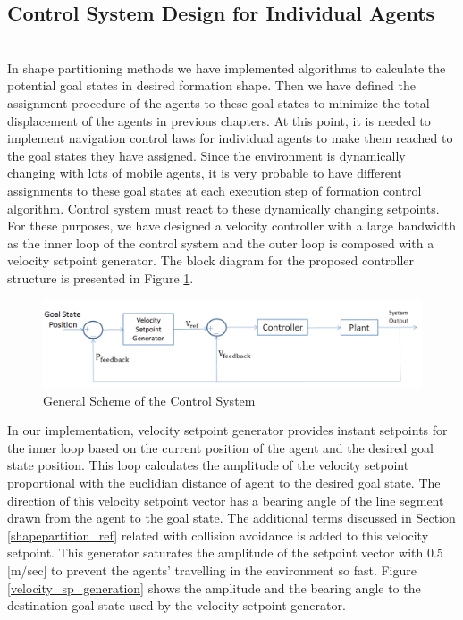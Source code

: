 \subsection{Control System Design for Individual Agents}\hspace{0pt}\label{lqr_design}  \\ 
In shape partitioning methods we have implemented algorithms to calculate the potential goal states in desired formation shape. Then we have defined the assignment procedure of the agents to these goal states to minimize the total displacement of the agents in previous chapters. At this point, it is needed to implement navigation control laws for individual agents to make them reached to the goal states they have assigned. Since the environment is dynamically changing with lots of  mobile agents, it is very probable to have different assignments to these goal states at each execution step of formation control algorithm. Control system must react to these dynamically changing setpoints. For these purposes, we have designed a velocity controller with a large bandwidth as the inner loop of the control system and the outer loop is composed with a velocity setpoint generator. The block diagram for the proposed controller structure is presented in Figure \ref{Controller_ref}.

\begin{figure}[H]
\caption{General Scheme of the Control System} \label{Controller_ref}
\centering
\includegraphics[scale = 0.45]{controller}
\end{figure}

In our implementation, velocity setpoint generator provides instant setpoints for the inner loop based on the current position of the agent and the desired goal state position.  This loop calculates the amplitude of the velocity setpoint proportional with the euclidian distance of agent to the desired goal state. The direction of this velocity setpoint vector has a bearing angle of the line segment drawn from the agent to the goal state. The additional terms discussed in Section \ref{shapepartition_ref} related with collision avoidance is added to this velocity setpoint. This generator saturates the amplitude of the setpoint vector with 0.5 [m/sec] to prevent the agents' travelling in the environment so fast. Figure \ref{velocity_sp_generation} shows the amplitude and the bearing angle to the destination goal state used by the velocity setpoint generator.

